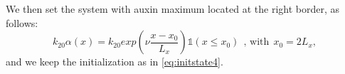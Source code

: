 We then set the system with auxin maximum located at the right border, as follows:
\begin{equation*}
  k_{20} \alpha(x) = k_{20} exp\left(\nu \frac{x-x_0}{L_x} \right) \mathbb{1}(x\leq x_0) \ \ \text{, with} \ \ x_0 = 2 L_x,
\end{equation*}
and we keep the initialization as in \eqref{eq:initstate4}.
